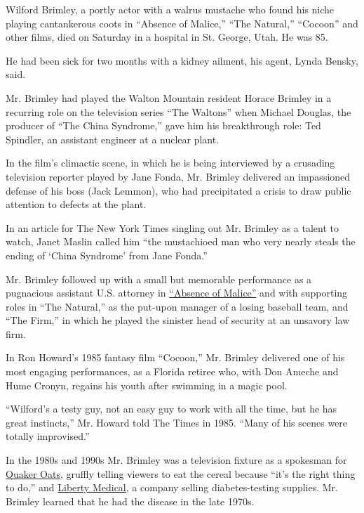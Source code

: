 Wilford Brimley, a portly actor with a walrus mustache who found his
niche playing cantankerous coots in ``Absence of Malice,'' ``The
Natural,'' ``Cocoon'' and other films, died on Saturday in a hospital in
St. George, Utah. He was 85.

He had been sick for two months with a kidney ailment, his agent, Lynda
Bensky, said.

Mr. Brimley had played the Walton Mountain resident Horace Brimley in a
recurring role on the television series ``The Waltons'' when Michael
Douglas, the producer of ``The China Syndrome,'' gave him his
breakthrough role: Ted Spindler, an assistant engineer at a nuclear
plant.

In the film's climactic scene, in which he is being interviewed by a
crusading television reporter played by Jane Fonda, Mr. Brimley
delivered an impassioned defense of his boss (Jack Lemmon), who had
precipitated a crisis to draw public attention to defects at the plant.

In an article for The New York Times singling out Mr. Brimley as a
talent to watch, Janet Maslin called him ``the mustachioed man who very
nearly steals the ending of `China Syndrome' from Jane Fonda.''

Mr. Brimley followed up with a small but memorable performance as a
pugnacious assistant U.S. attorney in
\href{https://www.youtube.com/watch?v=btqBJJF2yvE}{``Absence of
Malice''} and with supporting roles in ``The Natural,'' as the put-upon
manager of a losing baseball team, and ``The Firm,'' in which he played
the sinister head of security at an unsavory law firm.

In Ron Howard's 1985 fantasy film ``Cocoon,'' Mr. Brimley delivered one
of his most engaging performances, as a Florida retiree who, with Don
Ameche and Hume Cronyn, regains his youth after swimming in a magic
pool.

``Wilford's a testy guy, not an easy guy to work with all the time, but
he has great instincts,'' Mr. Howard told The Times in 1985. ``Many of
his scenes were totally improvised.''

In the 1980s and 1990s Mr. Brimley was a television fixture as a
spokesman for \href{https://www.youtube.com/watch?v=GOLXnkbfEuo}{Quaker
Oats}, gruffly telling viewers to eat the cereal because ``it's the
right thing to do,'' and
\href{https://www.youtube.com/watch?v=1K93EPoO7is}{Liberty Medical}, a
company selling diabetes-testing supplies. Mr. Brimley learned that he
had the disease in the late 1970s.

